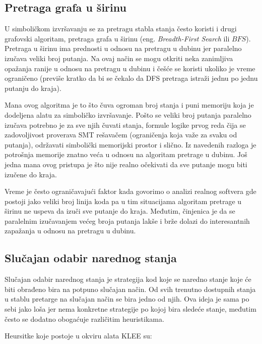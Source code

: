 \documentclass[12pt,oneside]{memoir}
\begin{document}
\bigbreak

\subsection{Pretraga grafa u širinu} \label{BFS}
U simboličkom izvršavanju se za pretragu stabla stanja često koristi i drugi grafovski algoritam, pretraga grafa u širinu (eng. \textit{Breadth-First Search} ili $BFS$). Pretraga u širinu ima prednosti u odnosu na pretragu u dubinu jer paralelno izučava veliki broj putanja. Na ovaj način se mogu otkriti neka zanimljiva opažanja ranije u odnosu na pretragu u dubinu i češće se koristi ukoliko je vreme ograničeno (previše kratko da bi se čekalo da DFS pretraga istraži jednu po jednu putanju do kraja). 

Mana ovog algoritma je to što čuva ogroman broj stanja i puni memoriju koja je dodeljena alatu za simboličko izvršavanje. Pošto se veliki broj putanja paralelno izučava potrebno je za sve njih čuvati stanja, formule logike prvog reda čija se zadovoljivost proverava SMT rešavačem (ograničenja koja važe za svaku od putanja), održavati simbolički memorijski prostor i slično. Iz navedenih razloga je potrošnja memorije znatno veća u odnosu na algoritam pretrage u dubinu. Još jedna mana ovog pristupa je što nije realno očekivati da sve putanje mogu biti izučene do kraja. 

Vreme je često ograničavajući faktor kada govorimo o analizi realnog softvera gde postoji jako veliki broj linija koda pa u tim situacijama algoritam pretrage u širinu ne uspeva da izuči sve putanje do kraja. Međutim, činjenica je da se paralelnim izučavanjem većeg broja putanja lakše i brže dolazi do interesantnih zapažanja u odnosu na pretragu u dubinu.

\bigbreak

\subsection{Slučajan odabir narednog stanja} 
Slučajan odabir narednog stanja je strategija kod koje se naredno stanje koje će biti obrađeno bira na potpuno slučajan način. Od svih trenutno dostupnih stanja u stablu pretarge na slučajan način se bira jedno od njih. Ova ideja je sama po sebi jako loša jer nema konkretne strategije po kojoj bira sledeće stanje, međutim često se dodatno obogaćuje različitim heuristikama. 

Heursitke koje postoje u okviru alata KLEE su:
\end{document}
